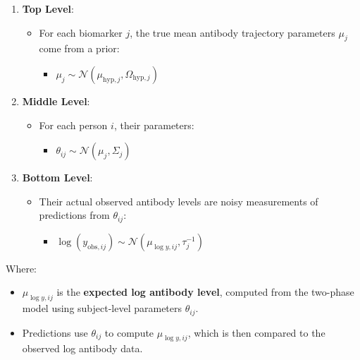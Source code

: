 \documentclass[
]{article}
\providecommand{\tightlist}{%
  \setlength{\itemsep}{0pt}\setlength{\parskip}{0pt}}\usepackage{longtable,booktabs,array}
\begin{document}
\begin{enumerate}
\def\labelenumi{\arabic{enumi}.}
\item
  \textbf{Top Level}:

  \begin{itemize}
  \tightlist
  \item
    For each biomarker \(j\), the true mean antibody trajectory
    parameters \(\mu_j\) come from a prior:

    \begin{itemize}
    \tightlist
    \item
      \(\mu_j \sim \mathcal{N}(\mu_{\text{hyp},j}, \Omega_{\text{hyp},j})\)
    \end{itemize}
  \end{itemize}
\item
  \textbf{Middle Level}:

  \begin{itemize}
  \tightlist
  \item
    For each person \(i\), their parameters:

    \begin{itemize}
    \tightlist
    \item
      \(\theta_{ij} \sim \mathcal{N}(\mu_j, \Sigma_j)\)
    \end{itemize}
  \end{itemize}
\item
  \textbf{Bottom Level}:

  \begin{itemize}
  \tightlist
  \item
    Their actual observed antibody levels are noisy measurements of
    predictions from \(\theta_{ij}\):

    \begin{itemize}
    \tightlist
    \item
      \(\log(y_{\text{obs},ij}) \sim \mathcal{N}(\mu_{\log y,ij}, \tau_j^{-1})\)
    \end{itemize}
  \end{itemize}
\end{enumerate}

Where:

\begin{itemize}
\tightlist
\item
  \(\mu_{\log y,ij}\) is the \textbf{expected log antibody level},
  computed from the two-phase model using subject-level parameters
  \(\theta_{ij}\).
\item
  Predictions use \(\theta_{ij}\) to compute \(\mu_{\log y,ij}\), which
  is then compared to the observed log antibody data.
\end{itemize}
\end{document}
